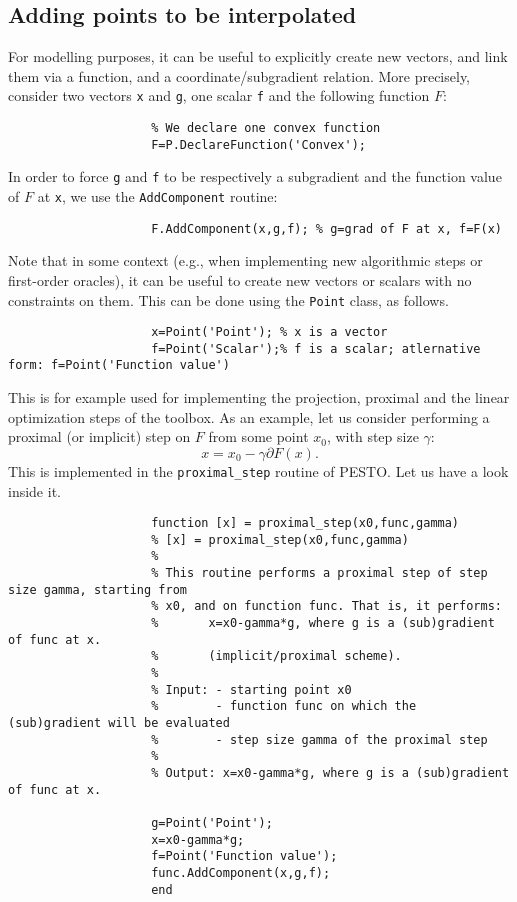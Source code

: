 \documentclass[11pt,a4paper]{article}
\begin{document}
					\subsection{Adding points to be interpolated}
					For modelling purposes, it can be useful to explicitly create new vectors, and link them via a function, and a coordinate/subgradient relation. More precisely, consider two vectors \verb?x? and \verb?g?, one scalar \verb?f? and the following function $F$:\\[-1cm]
					\begin{lstlisting}
					% We declare one convex function
					F=P.DeclareFunction('Convex');
					\end{lstlisting}
					In order to force \verb?g? and \verb?f? to be respectively a subgradient and the function value of $F$ at \verb?x?, we use the \verb?AddComponent? routine:\\[-1cm]
					\begin{lstlisting}
					F.AddComponent(x,g,f); % g=grad of F at x, f=F(x)
					\end{lstlisting}
					Note that in some context (e.g., when implementing new algorithmic steps or first-order oracles), it can be useful to create new vectors or scalars with no constraints on them. This can be done using the \verb?Point? class, as follows.\\[-1cm]
					\begin{lstlisting}
					x=Point('Point'); % x is a vector
					f=Point('Scalar');% f is a scalar; atlernative form: f=Point('Function value')
					\end{lstlisting}
					This is for example used for implementing the projection, proximal and the linear optimization steps of the toolbox. As an example, let us consider performing a proximal (or implicit) step on $F$ from some point $x_0$, with step size $\gamma$:
					\[x=x_0-\gamma \partial F(x).\]
					This is implemented in the \verb?proximal_step? routine of PESTO. Let us have a look inside it.\\[-1cm]
					\begin{lstlisting}
					function [x] = proximal_step(x0,func,gamma)
					% [x] = proximal_step(x0,func,gamma)
					%
					% This routine performs a proximal step of step size gamma, starting from
					% x0, and on function func. That is, it performs:
					%       x=x0-gamma*g, where g is a (sub)gradient of func at x.
					%       (implicit/proximal scheme).
					%
					% Input: - starting point x0
					%        - function func on which the (sub)gradient will be evaluated
					%        - step size gamma of the proximal step
					%
					% Output: x=x0-gamma*g, where g is a (sub)gradient of func at x.

					g=Point('Point');
					x=x0-gamma*g;
					f=Point('Function value');
					func.AddComponent(x,g,f);
					end
					\end{lstlisting}
\end{document}
